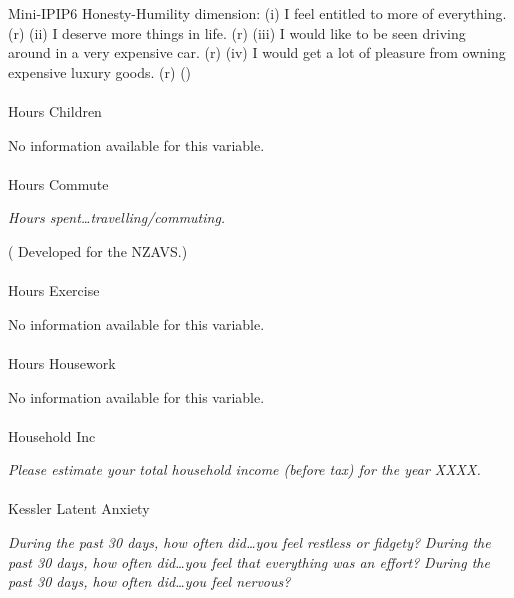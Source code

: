 \documentclass[
  single column]{article}
\makeatletter
\let\oldparagraph\paragraph
\renewcommand{\paragraph}{
    \@ifstar
      \xxxParagraphStar
      \xxxParagraphNoStar
  }
\newcommand{\xxxParagraphStar}[1]{\oldparagraph*{#1}\mbox{}}
\newcommand{\xxxParagraphNoStar}[1]{\oldparagraph{#1}\mbox{}}
\makeatother
\begin{document}
Mini-IPIP6 Honesty-Humility dimension: (i) I feel entitled to more of
everything. (r) (ii) I deserve more things in life. (r) (iii) I would
like to be seen driving around in a very expensive car. (r) (iv) I would
get a lot of pleasure from owning expensive luxury goods. (r)
()

\paragraph{Hours Children}\label{hours-children}

No information available for this variable.

\paragraph{Hours Commute}\label{hours-commute}

\emph{Hours spent\ldots travelling/commuting.}

( Developed for the
NZAVS.)

\paragraph{Hours Exercise}\label{hours-exercise}

No information available for this variable.

\paragraph{Hours Housework}\label{hours-housework}

No information available for this variable.

\paragraph{Household Inc}\label{household-inc}

\emph{Please estimate your total household income (before tax) for the
year XXXX.}

\paragraph{Kessler Latent Anxiety}\label{kessler-latent-anxiety}

\emph{During the past 30 days, how often did\ldots you feel restless or
fidgety?} \emph{During the past 30 days, how often did\ldots you feel
that everything was an effort?} \emph{During the past 30 days, how often
did\ldots you feel nervous?}
\end{document}
